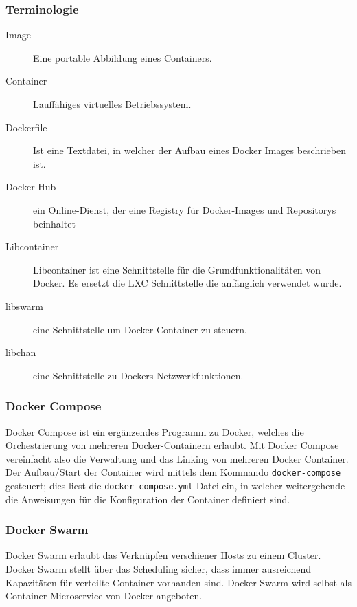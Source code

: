 \subsubsection{Terminologie}
\begin{description}
	\item[Image] Eine portable Abbildung eines Containers.
	\item[Container] Lauffähiges virtuelles Betriebssystem.
	\item[Dockerfile] Ist eine Textdatei, in welcher der Aufbau eines Docker Images beschrieben ist.
	\item[Docker Hub] ein Online-Dienst, der eine Registry für Docker-Images und Repositorys beinhaltet
	\item[Libcontainer] Libcontainer ist eine Schnittstelle für die Grundfunktionalitäten von Docker. Es ersetzt die LXC Schnittstelle die anfänglich verwendet wurde. 
	\item[libswarm]eine Schnittstelle um Docker-Container zu steuern.
	\item[libchan] eine Schnittstelle zu Dockers Netzwerkfunktionen.
\end{description}



\subsubsection{Docker Compose}
Docker Compose ist ein ergänzendes Programm zu Docker, welches die Orchestrierung von mehreren Docker-Containern erlaubt. Mit Docker Compose vereinfacht also die Verwaltung und das Linking von mehreren Docker Container. Der Aufbau/Start der Container wird mittels dem Kommando \lstinline|docker-compose| gesteuert; dies liest die \lstinline|docker-compose.yml|-Datei ein, in welcher weitergehende die Anweisungen für die Konfiguration der Container definiert sind.


\subsubsection{Docker Swarm}
Docker Swarm erlaubt das Verknüpfen verschiener Hosts zu einem Cluster. Docker Swarm stellt über das Scheduling sicher, dass immer ausreichend Kapazitäten für verteilte Container vorhanden sind. Docker Swarm wird selbst als Container Microservice von Docker angeboten.


